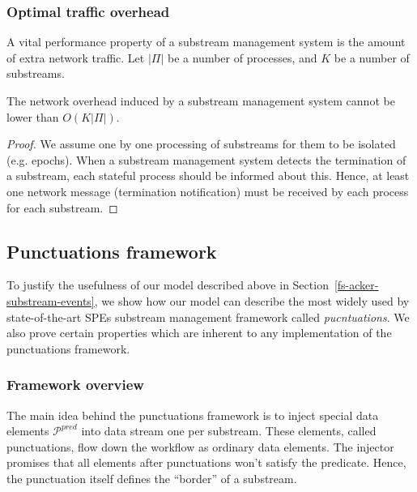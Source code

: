 \subsubsection{Optimal traffic overhead}

A vital performance property of a substream management system is the amount of extra network traffic. Let $|\Pi|$ be a number of processes, and $K$ be a number of substreams. 

\begin{lemma}
The network overhead induced by a substream management system cannot be lower than $O(K|\Pi|)$. 
\end{lemma}
\begin{proof}
We assume one by one processing of substreams for them to be isolated (e.g. epochs). When a substream management system detects the termination of a substream, each stateful process should be informed about this. Hence, at least one network message (termination notification) must be received by each process for each substream.
\end{proof}


\subsection{Punctuations framework}
\label{fs-acker-punctuations}

To justify the usefulness of our model described above in Section~\ref{fs-acker-substream-events}, we show how our model can describe the most widely used by state-of-the-art SPEs substream management framework called {\em pucntuations}. We also prove certain properties which are inherent to any implementation of the punctuations framework. 

\subsubsection{Framework overview}

The main idea behind the punctuations framework is to inject special data elements $\mathcal{P}^{pred}$ into data stream one per substream. These elements, called punctuations, flow down the workflow as ordinary data elements. The injector promises that all elements after punctuations won't satisfy the predicate. Hence, the punctuation itself defines the ``border'' of a substream.


